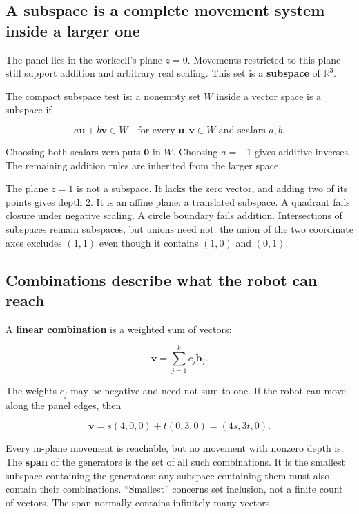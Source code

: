 \subsection{A subspace is a complete movement system inside a larger one}\label{01-foundations-i-ch017-a-subspace-is-a-complete-movement-system-inside-a-larger-one}

The panel lies in the workcell's plane \(z=0\). Movements restricted to this plane still support addition and arbitrary real scaling. This set is a \textbf{subspace} of \(\mathbb R^3\).

The compact subspace test is: a nonempty set \(W\) inside a vector space is a subspace if

\[
a\mathbf u+b\mathbf v\in W
\quad\text{for every }\mathbf u,\mathbf v\in W
\text{ and scalars }a,b.
\]

Choosing both scalars zero puts \(\mathbf0\) in \(W\). Choosing \(a=-1\) gives additive inverses. The remaining addition rules are inherited from the larger space.

The plane \(z=1\) is not a subspace. It lacks the zero vector, and adding two of its points gives depth \(2\). It is an affine plane: a translated subspace. A quadrant fails closure under negative scaling. A circle boundary fails addition. Intersections of subspaces remain subspaces, but unions need not: the union of the two coordinate axes excludes \((1,1)\) even though it contains \((1,0)\) and \((0,1)\).

\subsection{Combinations describe what the robot can reach}\label{01-foundations-i-ch017-combinations-describe-what-the-robot-can-reach}

A \textbf{linear combination} is a weighted sum of vectors:

\[
\mathbf v=\sum_{j=1}^{k}c_j\mathbf b_j.
\]

The weights \(c_j\) may be negative and need not sum to one. If the robot can move along the panel edges, then

\[
\mathbf v=s(4,0,0)+t(0,3,0)=(4s,3t,0).
\]

Every in-plane movement is reachable, but no movement with nonzero depth is. The \textbf{span} of the generators is the set of all such combinations. It is the smallest subspace containing the generators: any subspace containing them must also contain their combinations. ``Smallest'' concerns set inclusion, not a finite count of vectors. The span normally contains infinitely many vectors.

